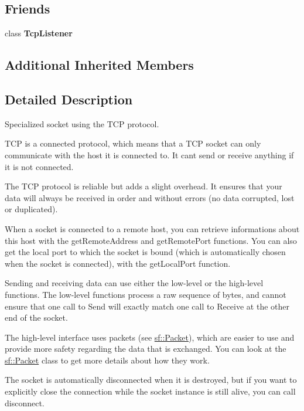 \subsection*{Friends}
\begin{DoxyCompactItemize}
\item 
\mbox{\label{classsf_1_1_tcp_socket_a2b2dd140834917bd44b512236bddea7c}} 
class {\bfseries Tcp\+Listener}
\end{DoxyCompactItemize}
\subsection*{Additional Inherited Members}


\subsection{Detailed Description}
Specialized socket using the T\+CP protocol. 

T\+CP is a connected protocol, which means that a T\+CP socket can only communicate with the host it is connected to. It can\textquotesingle{}t send or receive anything if it is not connected.

The T\+CP protocol is reliable but adds a slight overhead. It ensures that your data will always be received in order and without errors (no data corrupted, lost or duplicated).

When a socket is connected to a remote host, you can retrieve informations about this host with the get\+Remote\+Address and get\+Remote\+Port functions. You can also get the local port to which the socket is bound (which is automatically chosen when the socket is connected), with the get\+Local\+Port function.

Sending and receiving data can use either the low-\/level or the high-\/level functions. The low-\/level functions process a raw sequence of bytes, and cannot ensure that one call to Send will exactly match one call to Receive at the other end of the socket.

The high-\/level interface uses packets (see \hyperlink{classsf_1_1_packet}{sf\+::\+Packet}), which are easier to use and provide more safety regarding the data that is exchanged. You can look at the \hyperlink{classsf_1_1_packet}{sf\+::\+Packet} class to get more details about how they work.

The socket is automatically disconnected when it is destroyed, but if you want to explicitly close the connection while the socket instance is still alive, you can call disconnect.

